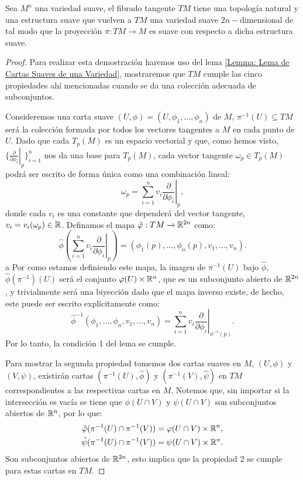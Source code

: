 \begin{theorem}\label{Teorema: Estructura de Variedad del Fibrado Tangente}
	Sea $M^n$ una variedad suave, el fibrado tangente $TM$ tiene una topología natural y una estructura suave que vuelven a $TM$ una variedad suave $2n-$dimensional de tal modo que la proyección $\pi: TM \to M$ es suave con respecto a dicha estructura suave.
\end{theorem}

\begin{proof}
	Para realizar esta demostración haremos uso del lema \ref{Lemma: Lema de Cartas Suaves de una Variedad}, mostraremos que $TM$ cumple las cinco propiedades ahí mencionadas cuando se da una colección adecuada de subconjuntos.

	Consideremos una carta suave $(U,\phi)=(U,\phi_1,\dots,\phi_n)$ de $M$, $\pi^{-1}(U) \subseteq TM$ será la colección formada por todos los vectores tangentes a $M$ en cada punto de $U$. Dado que cada $T_p(M)$ es un espacio vectorial y que, como hemos visto, $\{\left. \frac{\partial}{\partial \phi_{i}} \right|_{p}\}_{i=1}^{n}$ nos da una base para $T_p(M)$, cada vector tangente $\omega_p \in T_p(M)$ podrá ser escrito de forma única como una combinación lineal:
	\[
		\omega_p = \sum_{i=1}^{n} v_i \left. \frac{\partial}{\partial \phi_{i}}\right|_{p},
	\]
	donde cada $v_i$ es una constante que dependerá del vector tangente, $v_i = v_i(\omega_p) \in \mathbb{R}$. Definamos el mapa $\hat{\varphi}: TM \to \mathbb{R}^{2n}$ como:
	\[
		\hat{\phi} \left(\sum_{i=1}^{n} v_i
		\left. \frac{\partial}{\partial \phi_{i}}\right|_{p} \right)
		=
		\left(\phi_1(p), \dots, \phi_n(p), v_1, \dots, v_n \right).
	\]
	a
	Por como estamos definiendo este mapa, la imagen de $\pi^{-1}(U)$ bajo $\hat{\phi}$, $\hat{\phi}(\pi^{-1})(U)$ será el conjunto $\varphi(U) \times \mathbb{R}^n$, que es un subconjunto abierto de $\mathbb{R}^{2n}$, y trivialmente será una biyección dado que el mapa inverso existe, de hecho, este puede ser escrito explícitamente como:
	\[
		\hat{\phi}^{-1}(\phi_{1},\dots, \phi_{n}, v_1, \dots, v_n)
		=
		\sum_{i=1}^{n} v_i \left. \frac{\partial}{\partial \phi_i} \right|_{\phi^{-1}(p)}.
	\]
	Por lo tanto, la condición 1 del lema se cumple.

	Para mostrar la segunda propiedad tomemos dos cartas suaves en $M$, $(U,\phi)$ y $(V,\psi)$, existirán cartas $(\pi^{-1}(U),\hat{\phi})$ y $(\pi^{-1}(V),\hat{\psi})$ en $TM$ correspondientes a las respectivas cartas en $M$. Notemos que, sin importar si la intersección es vacía se tiene que $\phi(U \cap V)$ y $\psi(U \cap V)$ son subconjuntos abiertos de $\mathbb{R}^n$, por lo que:
	\begin{align*}
		\hat{\varphi}(\pi^{-1}(U) \cap \pi^{-1}(V)) & =
		\varphi(U \cap V) \times \mathbb{R}^n,                  \\
		\hat{\psi}(\pi^{-1}(U) \cap \pi^{-1}(V)) & =
		\psi(U \cap V) \times \mathbb{R}^n.                  \\
	\end{align*}
	Son subconjuntos abiertos de $\mathbb{R}^{2n}$, esto implica que la propiedad 2 se cumple para estas cartas en $TM$.


\end{proof}
